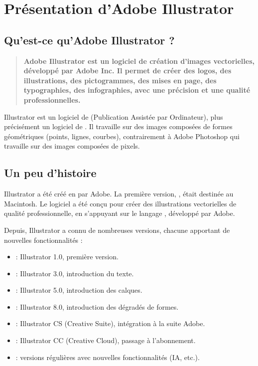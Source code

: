 \section{Présentation d'Adobe Illustrator}

\subsection{Qu'est-ce qu'Adobe Illustrator ?}

\begin{quote}
\textbf{Adobe Illustrator est un logiciel de création d'images vectorielles, développé par Adobe Inc. Il permet de créer des logos, des illustrations, des pictogrammes, des mises en page, des typographies, des infographies, avec une précision et une qualité professionnelles.}
\end{quote}

Illustrator est un logiciel de  (Publication Assistée par Ordinateur), plus précisément un logiciel de . Il travaille sur des images composées de formes géométriques (points, lignes, courbes), contrairement à Adobe Photoshop qui travaille sur des images composées de pixels.

\subsection{Un peu d'histoire}

Illustrator a été créé en  par Adobe. La première version, , était destinée au Macintosh. Le logiciel a été conçu pour créer des illustrations vectorielles de qualité professionnelle, en s'appuyant sur le langage , développé par Adobe.

Depuis, Illustrator a connu de nombreuses versions, chacune apportant de nouvelles fonctionnalités :

\begin{itemize}
    \item {} : Illustrator 1.0, première version.
    \item {} : Illustrator 3.0, introduction du texte.
    \item {} : Illustrator 5.0, introduction des calques.
    \item {} : Illustrator 8.0, introduction des dégradés de formes.
    \item {} : Illustrator CS (Creative Suite), intégration à la suite Adobe.
    \item {} : Illustrator CC (Creative Cloud), passage à l'abonnement.
    \item {} : versions régulières avec nouvelles fonctionnalités (IA, etc.).
\end{itemize}

